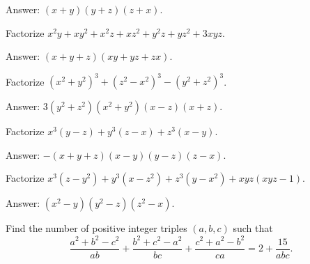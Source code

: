\documentclass[12pt,a4paper]{memoir}
\theoremstyle{definition}
\begin{document}
\begin{solution}[name=Solution by Parviz Shahriari]
	Answer: $(x+y)(y+z)(z+x)$.
\end{solution}


\begin{tcolorbox}
	\begin{question}
		Factorize $x^2y+xy^2+x^2z+xz^2+y^2z+yz^2+3xyz$.
	\end{question}
\end{tcolorbox}

\begin{solution}[name=Solution by Parviz Shahriari]
	Answer: $(x+y+z)(xy+yz+zx)$.
\end{solution}

\begin{tcolorbox}
	\begin{question}
		Factorize $(x^2+y^2)^3+(z^2-x^2)^3-(y^2+z^2)^3$.
	\end{question}
\end{tcolorbox}

\begin{solution}[name=Solution by Parviz Shahriari]
	Answer: $3(y^2+z^2)(x^2+y^2)(x-z)(x+z)$.
\end{solution}


\begin{tcolorbox}
	\begin{question}
		Factorize $x^3(y-z) + y^3(z-x) + z^3(x-y)$.
	\end{question}
\end{tcolorbox}

\begin{solution}[name=Solution by Parviz Shahriari]
	Answer: $-(x+y+z)(x-y)(y-z)(z-x)$.
\end{solution}


\begin{tcolorbox}
	\begin{question}
		Factorize $x^3(z-y^2)+y^3(x-z^2)+z^3(y-x^2)+xyz(xyz-1)$.
	\end{question}
\end{tcolorbox}

\begin{solution}[name=Solution by Parviz Shahriari]
	Answer: $(x^2-y)(y^2-z)(z^2-x)$.
\end{solution}


\begin{question}[name={2006 Korea}]
	Find the number of positive integer triples $(a,b,c)$ such that
	\[\frac{a^2+b^2-c^2}{ab}+\frac{b^2+c^2-a^2}{bc}+\frac{c^2+a^2-b^2}{ca}=2+\frac{15}{abc}.\]
\end{question}
\end{document}
